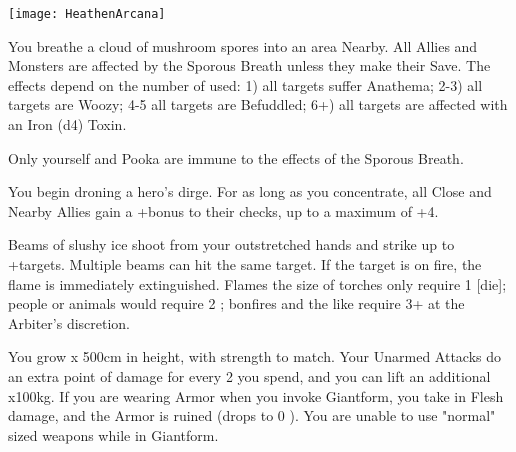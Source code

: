 {  \begin{center}
  \texttt{[image: HeathenArcana]}
  \end{center}



\MYSTERY [
  Name = Sporous Breath,
  Link = arcana-mystery-sporous-breath,
  Paradigm = Biomancy,
  Save = Y (neg.),
  Duration = Combat or \SUM Minutes,
  Target = Nearby Target(s)
]

You breathe a cloud of mushroom spores into an area Nearby.  All Allies and Monsters are affected by the Sporous Breath unless they make their Save.  The effects depend on the number of \DICE used: 1) all targets suffer Anathema; 2-3)  all targets are Woozy; 4-5 all targets are Befuddled; 6+) all targets are affected with an Iron (d4) Toxin.

Only yourself and Pooka are immune to the effects of the Sporous Breath.

\MYSTERY [
  Name = Dirge,
  Link = arcana-mystery-dirge,
  Paradigm = Death,
  Save = n/a,
  Duration = Concentration,
  Target = Close Target(s)
]

You begin droning a hero's dirge.  For as long as you concentrate, all Close and Nearby Allies gain a +\DICE bonus to their \DEATH checks, up to a maximum of +4.

\MYSTERY [
  Name = Extinguish,
  Link = arcana-mystery-extinguish,
  Paradigm = Elements,
  Save = N,
  Duration = Instant,
  Target = Close or Nearby Target(s)
]

Beams of slushy ice shoot from your outstretched hands and strike up to \DICE+\DICE targets.  Multiple beams can hit the same target.  If the target is on fire, the flame is immediately extinguished.  Flames the size of torches only require 1 [die]; people or animals would require 2 \DICE; bonfires and the like require 3+ \DICE at the Arbiter's discretion.

\MYSTERY [
  Name = Giantform,
  Link = arcana-mystery-giantform,
  Paradigm = Biomancy,
  Save = n/a,
  Duration = Combat or \SUM Minutes,
  Target = Self
]

You grow \DICE x 500cm in height, with strength to match.  Your Unarmed Attacks do an extra point of damage for every 2 \DICE you spend, and you can lift an additional \DICE x100kg.   If you are wearing Armor when you invoke Giantform, you take \MAX \UD in Flesh damage, and the Armor is ruined (drops to 0 \MAX \UD).  You are unable to use "normal" sized weapons while in Giantform.

}
